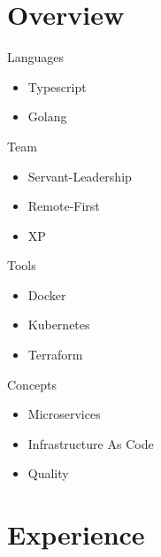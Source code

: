 \documentclass[11pt, a4paper, sans]{moderncv}
\date{02/02/2022}
\begin{document}
\makecvtitle

\vspace*{-10mm}

\section{Overview}

\small{
  \begin{cvcolumns}
    \cvcolumn
      {Languages}
      {
        \begin{itemize}
          \item Typescript
          \item Golang
        \end{itemize}
      }

    \cvcolumn
      {Team}
      {
        \begin{itemize}
          \item Servant-Leadership
          \item Remote-First
          \item XP
        \end{itemize}
      }

    \cvcolumn
      {Tools}
      {
        \begin{itemize}
          \item Docker
          \item Kubernetes
          \item Terraform
        \end{itemize}
      }

    \cvcolumn
      {Concepts}
      {
        \begin{itemize}
          \item Microservices
          \item Infrastructure As Code
          \item Quality
        \end{itemize}
      }
  \end{cvcolumns}
}

\vspace*{-5mm}

\section{Experience}
\end{document}
